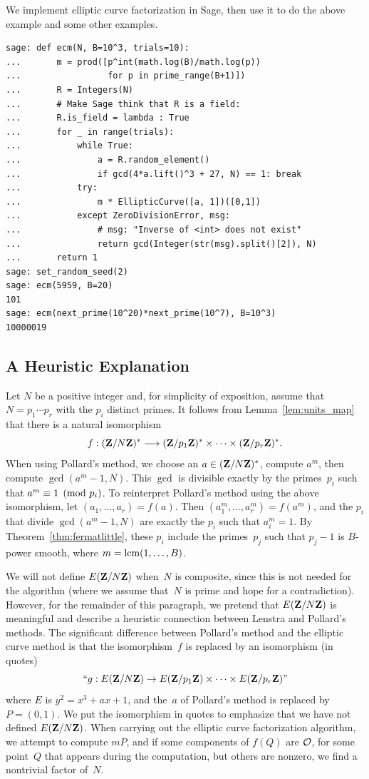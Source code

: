 \begin{sg}
  We implement elliptic curve factorization in Sage, then
  use it to do the above example and some other examples.
\begin{verbatim}
sage: def ecm(N, B=10^3, trials=10):
...       m = prod([p^int(math.log(B)/math.log(p))
...                 for p in prime_range(B+1)])
...       R = Integers(N)
...       # Make Sage think that R is a field:
...       R.is_field = lambda : True
...       for _ in range(trials):
...           while True:
...               a = R.random_element()
...               if gcd(4*a.lift()^3 + 27, N) == 1: break
...           try:
...               m * EllipticCurve([a, 1])([0,1])
...           except ZeroDivisionError, msg:
...               # msg: "Inverse of <int> does not exist"
...               return gcd(Integer(str(msg).split()[2]), N)
...       return 1
sage: set_random_seed(2)
sage: ecm(5959, B=20)
101
sage: ecm(next_prime(10^20)*next_prime(10^7), B=10^3)
10000019
\end{verbatim}
\end{sg}

\subsection{A Heuristic Explanation}\label{sec:methods}
Let $N$ be a positive integer and, for simplicity of exposition,
assume that $N=p_1\cdots p_r$ with the $p_i$ distinct primes.
It follows from Lemma~\ref{lem:units_map} that there is a
natural isomorphism
$$
f : (\mathbf{Z}/N\mathbf{Z})^* \longrightarrow (\mathbf{Z}/p_1\mathbf{Z})^* \times \cdots \times (\mathbf{Z}/p_r\mathbf{Z})^*.
$$
When using Pollard's method, we choose an $a\in (\mathbf{Z}/N\mathbf{Z})^*$,
compute $a^m$, then compute $\gcd(a^m-1,N)$.  This $\gcd$ is divisible
exactly by the primes~$p_i$ such that $a^m \equiv 1\pmod{p_i}$.  To
reinterpret Pollard's method using the above isomorphism, let
$(a_1,\ldots,a_r) = f(a)$.  Then $(a_1^m,\ldots,a_r^m) = f(a^m)$, and
the $p_i$ that divide $\gcd(a^m-1,N)$ are exactly the $p_i$ such that
$a_i^m=1$.  By Theorem~\ref{thm:fermatlittle}, these $p_i$ include the
primes~$p_j$ such that $p_j-1$ is $B$-power smooth, where
$m=\operatorname{lcm}(1,\ldots,B)$.

We will not define $E(\mathbf{Z}/N\mathbf{Z}{})$ when~$N$ is composite, since this is
not needed for the algorithm (where we assume that~$N$ is prime and
hope for a contradiction).  However, for the remainder of this
paragraph, we pretend that $E(\mathbf{Z}/N\mathbf{Z}{})$ is meaningful and describe a
heuristic connection between Lenstra and Pollard's methods.  The
significant difference between Pollard's method and the elliptic curve
method is that the isomorphism~$f$ is replaced by an isomorphism (in
quotes)
$$
``g : E(\mathbf{Z}/N\mathbf{Z}{}) \rightarrow E(\mathbf{Z}/p_1\mathbf{Z}{}) \times \cdots \times E(\mathbf{Z}/p_r\mathbf{Z}{}) \mbox{\rm ''}
$$
where $E$ is $y^2=x^3+ax+1$, and the~$a$ of Pollard's method is
replaced by $P=(0,1)$.  We put the isomorphism in quotes to emphasize
that we have not defined $E(\mathbf{Z}/N\mathbf{Z}{})$.  When carrying out the
elliptic curve factorization algorithm, we attempt to compute $mP$,
and if some components of $f(Q)$ are $\mathcal{O}$, for some point~$Q$ that
appears during the computation, but others are nonzero, we find a
nontrivial factor of~$N$.


